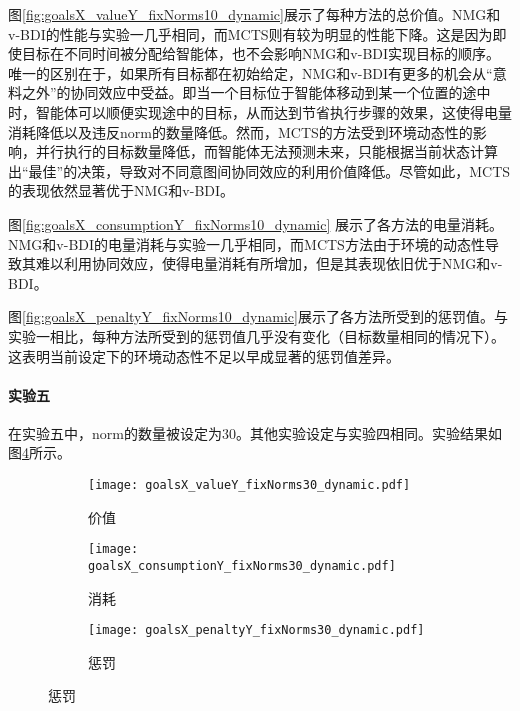 图\ref{fig:goalsX_valueY_fixNorms10_dynamic}展示了每种方法的总价值。NMG和v-BDI的性能与实验一几乎相同，而MCTS则有较为明显的性能下降。这是因为即使目标在不同时间被分配给智能体，也不会影响NMG和v-BDI实现目标的顺序。唯一的区别在于，如果所有目标都在初始给定，NMG和v-BDI有更多的机会从“意料之外”的协同效应中受益。即当一个目标位于智能体移动到某一个位置的途中时，智能体可以顺便实现途中的目标，从而达到节省执行步骤的效果，这使得电量消耗降低以及违反norm的数量降低。然而，MCTS的方法受到环境动态性的影响，并行执行的目标数量降低，而智能体无法预测未来，只能根据当前状态计算出“最佳”的决策，导致对不同意图间协同效应的利用价值降低。尽管如此，MCTS的表现依然显著优于NMG和v-BDI。

图\ref{fig:goalsX_consumptionY_fixNorms10_dynamic} 展示了各方法的电量消耗。NMG和v-BDI的电量消耗与实验一几乎相同，而MCTS方法由于环境的动态性导致其难以利用协同效应，使得电量消耗有所增加，但是其表现依旧优于NMG和v-BDI。

图\ref{fig:goalsX_penaltyY_fixNorms10_dynamic}展示了各方法所受到的惩罚值。与实验一相比，每种方法所受到的惩罚值几乎没有变化（目标数量相同的情况下）。这表明当前设定下的环境动态性不足以早成显著的惩罚值差异。

\paragraph{实验五}
在实验五中，norm的数量被设定为30。其他实验设定与实验四相同。实验结果如图\ref{fig:all_fixNorms30_dynamic}所示。
\begin{figure}
\centering
\begin{subfigure}{.47\textwidth}
  \centering
  \texttt{[image: goalsX\_valueY\_fixNorms30\_dynamic.pdf]}
  \captionsetup{justification=centering}
  \caption{价值}
  \label{fig:goalsX_valueY_fixNorms30_dynamic}
\end{subfigure}

\begin{subfigure}{.47\textwidth}
  \centering
  \texttt{[image: goalsX\_consumptionY\_fixNorms30\_dynamic.pdf]}
  \captionsetup{justification=centering}
  \caption{消耗}
  \label{fig:goalsX_consumptionY_fixNorms30_dynamic}
\end{subfigure}
\begin{subfigure}{.47\textwidth}
  \centering
  \texttt{[image: goalsX\_penaltyY\_fixNorms30\_dynamic.pdf]}
  \captionsetup{justification=centering}
  \caption{惩罚}
  \label{fig:goalsX_penaltyY_fixNorms30_dynamic}
\end{subfigure}
\captionsetup{justification=centering}
\label{fig:all_fixNorms30_dynamic}
\end{figure}

